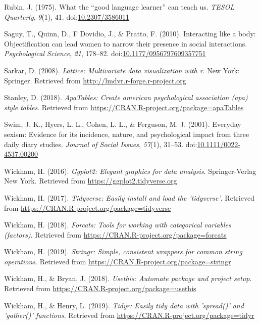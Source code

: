 \documentclass[man]{apa6}
\begin{document}
\hypertarget{ref-rubin1975}{}
Rubin, J. (1975). What the ``good language learner'' can teach us.
\emph{TESOL Quarterly}, \emph{9}(1), 41.
doi:\href{https://doi.org/10.2307/3586011}{10.2307/3586011}

\hypertarget{ref-saguyetal2010}{}
Saguy, T., Quinn, D., F Dovidio, J., \& Pratto, F. (2010). Interacting
like a body: Objectification can lead women to narrow their presence in
social interactions. \emph{Psychological Science}, \emph{21}, 178--82.
doi:\href{https://doi.org/10.1177/0956797609357751}{10.1177/0956797609357751}

\hypertarget{ref-R-lattice}{}
Sarkar, D. (2008). \emph{Lattice: Multivariate data visualization with
r}. New York: Springer. Retrieved from
\url{http://lmdvr.r-forge.r-project.org}

\hypertarget{ref-R-apaTables}{}
Stanley, D. (2018). \emph{ApaTables: Create american psychological
association (apa) style tables}. Retrieved from
\url{https://CRAN.R-project.org/package=apaTables}

\hypertarget{ref-swimetal}{}
Swim, J. K., Hyers, L. L., Cohen, L. L., \& Ferguson, M. J. (2001).
Everyday sexism: Evidence for its incidence, nature, and psychological
impact from three daily diary studies. \emph{Journal of Social Issues},
\emph{57}(1), 31--53.
doi:\href{https://doi.org/10.1111/0022-4537.00200}{10.1111/0022-4537.00200}

\hypertarget{ref-R-ggplot2}{}
Wickham, H. (2016). \emph{Ggplot2: Elegant graphics for data analysis}.
Springer-Verlag New York. Retrieved from
\url{https://ggplot2.tidyverse.org}

\hypertarget{ref-R-tidyverse}{}
Wickham, H. (2017). \emph{Tidyverse: Easily install and load the
'tidyverse'}. Retrieved from
\url{https://CRAN.R-project.org/package=tidyverse}

\hypertarget{ref-R-forcats}{}
Wickham, H. (2018). \emph{Forcats: Tools for working with categorical
variables (factors)}. Retrieved from
\url{https://CRAN.R-project.org/package=forcats}

\hypertarget{ref-R-stringr}{}
Wickham, H. (2019). \emph{Stringr: Simple, consistent wrappers for
common string operations}. Retrieved from
\url{https://CRAN.R-project.org/package=stringr}

\hypertarget{ref-R-usethis}{}
Wickham, H., \& Bryan, J. (2018). \emph{Usethis: Automate package and
project setup}. Retrieved from
\url{https://CRAN.R-project.org/package=usethis}

\hypertarget{ref-R-tidyr}{}
Wickham, H., \& Henry, L. (2019). \emph{Tidyr: Easily tidy data with
'spread()' and 'gather()' functions}. Retrieved from
\url{https://CRAN.R-project.org/package=tidyr}
\end{document}
